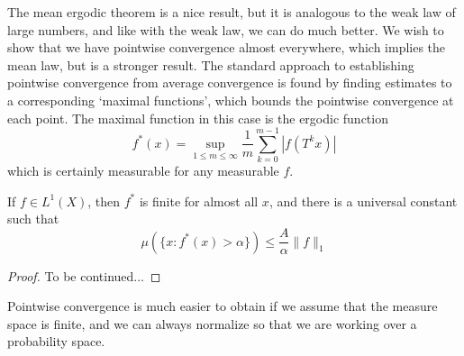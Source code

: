 The mean ergodic theorem is a nice result, but it is analogous to the weak law of large numbers, and like with the weak law, we can do much better. We wish to show that we have pointwise convergence almost everywhere, which implies the mean law, but is a stronger result. The standard approach to establishing pointwise convergence from average convergence is found by finding estimates to a corresponding `maximal functions', which bounds the pointwise convergence at each point. The maximal function in this case is the ergodic function
%
\[ f^*(x) = \sup_{1 \leq m \leq \infty} \frac{1}{m} \sum_{k = 0}^{m-1} |f(T^k x)| \]
%
which is certainly measurable for any measurable $f$.

\begin{theorem}
    If $f \in L^1(X)$, then $f^*$ is finite for almost all $x$, and there is a universal constant such that
    \[ \mu(\{ x : f^*(x) > \alpha \}) \leq \frac{A}{\alpha} \| f \|_1 \]
\end{theorem}
\begin{proof}
    To be continued...
\end{proof}

Pointwise convergence is much easier to obtain if we assume that the measure space is finite, and we can always normalize so that we are working over a probability space.

